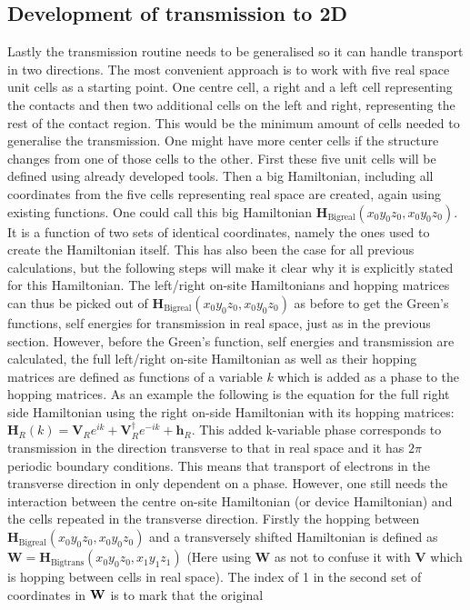 \vspace{-1\baselineskip}
\vspace{\baselineskip}
\subsection{Development of transmission to 2D}\label{trans2d}
Lastly the transmission routine needs to be generalised so it can handle transport in two directions. The most convenient approach is to work with five real space unit cells as a starting point. One centre cell, a right and a left cell representing the contacts and then two additional cells on the left and right, representing the rest of the contact region. This would be the minimum amount of cells needed to generalise the transmission. One might have more center cells if the structure changes from one of those cells to the other. First these five unit cells will be defined using already developed tools. Then a big Hamiltonian, including all coordinates from the five cells representing real space are created, again using existing functions. One could call this big Hamiltonian \(\textbf{H}_{\text{Bigreal}}(x_0y_0z_0,x_0y_0z_0)\). It is a function of two sets of identical coordinates, namely the ones used to create the Hamiltonian itself. This has also been the case for all previous calculations, but the following steps will make it clear why it is explicitly stated for this Hamiltonian. The left/right on-site Hamiltonians and hopping matrices can thus be picked out of \(\textbf{H}_{\text{Bigreal}}(x_0y_0z_0,x_0y_0z_0)\) as before to get the Green's functions, self energies for transmission in real space, just as in the previous section. However, before the Green's function, self energies and transmission are calculated, the full left/right on-site Hamiltonian as well as their hopping matrices are defined as functions of a variable \(k\) which is added as a phase to the hopping matrices. As an example the following is the equation for the full right side Hamiltonian using the right on-side Hamiltonian with its hopping matrices: \(\textbf{H}_R(k) = \textbf{V}_Re^{ik}+\textbf{V}^{\dagger}_Re^{-ik}+\textbf{h}_R\). This added k-variable phase corresponds to transmission in the direction transverse to that in real space and it has \(2\pi\) periodic boundary conditions. This means that transport of electrons in the transverse direction in only dependent on a phase. However, one still needs the interaction between the centre on-site Hamiltonian (or device Hamiltonian) and the cells repeated in the transverse direction. Firstly the hopping between \(\textbf{H}_{\text{Bigreal}}(x_0y_0z_0,x_0y_0z_0)\) and a transversely shifted Hamiltonian is defined as \(\textbf{W} = \textbf{H}_{\text{Bigtrans}}(x_0y_0z_0,x_1y_1z_1)\) (Here using \textbf{W} as not to confuse it with \textbf{V} which is hopping between cells in real space). The  index of 1 in the second set of coordinates in \(\vb{W}\) is to mark that the original 